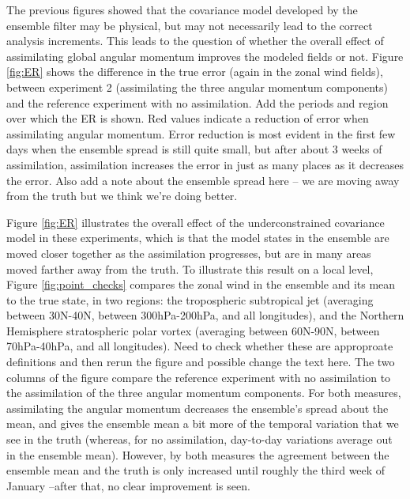 The previous figures showed that the covariance model developed by the ensemble filter may be physical, but may not necessarily lead to the correct analysis increments. 
This leads to the question of whether the overall effect of assimilating global angular momentum improves the modeled fields or not. 
Figure \ref{fig:ER} shows the difference in the true error (again in the zonal wind fields), between experiment 2 (assimilating the three angular momentum components) and the reference experiment with no assimilation.
\textcolor{alert}{Add the periods and region over which the ER is shown.}
Red values indicate a reduction of error when assimilating angular momentum.
\textcolor{unsure}{Error reduction is most evident in the first few days when the ensemble spread is still quite small, but after about 3 weeks of assimilation, assimilation increases the error in just as many places as it decreases the error.}
\textcolor{alert}{Also add a note about the ensemble spread here -- we are moving away from the truth but we think we're doing better.}


Figure \ref{fig:ER} illustrates the overall effect of the underconstrained covariance model in these experiments, which is that the model states in the ensemble are moved closer together as the assimilation progresses, but are in many areas moved farther away from the truth.
To illustrate this result on a local level, Figure \ref{fig:point_checks} compares the zonal wind in the ensemble and its mean to the true state, in two regions: the tropospheric subtropical jet (averaging between 30N-40N, between 300hPa-200hPa, and all longitudes), and the Northern Hemisphere stratospheric polar vortex (averaging between 60N-90N, between 70hPa-40hPa, and all longitudes).
\textcolor{alert}{Need to check whether these are approproate definitions and then rerun the figure and possible change the text here.}
The two columns of the figure compare the reference experiment with no assimilation to the assimilation of the three angular momentum components. 
For both measures, assimilating the angular momentum decreases the ensemble's spread about the mean, and gives the ensemble mean a bit more of the temporal variation that we see in the truth (whereas, for no assimilation, day-to-day variations average out in the ensemble mean). 
However, by both measures the agreement between the ensemble mean and the truth is only increased until roughly the third week of January --after that, no clear improvement is seen.

